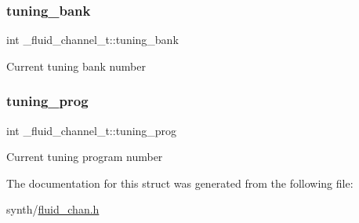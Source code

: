 \subsubsection{\texorpdfstring{tuning\+\_\+bank}{tuning\_bank}}
{\footnotesize\ttfamily int \+\_\+fluid\+\_\+channel\+\_\+t\+::tuning\+\_\+bank}

Current tuning bank number \mbox{\label{struct__fluid__channel__t_a9407c86a964afd9a593d7ef02e2ed6a9}} 
\subsubsection{\texorpdfstring{tuning\+\_\+prog}{tuning\_prog}}
{\footnotesize\ttfamily int \+\_\+fluid\+\_\+channel\+\_\+t\+::tuning\+\_\+prog}

Current tuning program number 

The documentation for this struct was generated from the following file\+:\begin{DoxyCompactItemize}
\item 
synth/\hyperlink{fluid__chan_8h}{fluid\+\_\+chan.\+h}\end{DoxyCompactItemize}
